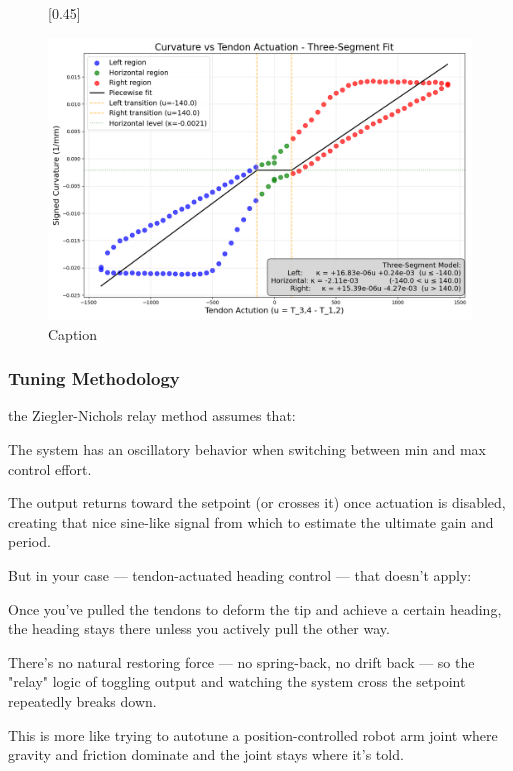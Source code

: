 \begin{figure}[H]
\begin{subcaptionbox}{\label{fig:right}}[0.45\linewidth]
    \end{subcaptionbox}
    \caption{}
    \label{fig:ribbonadaptation}
\end{figure}

\begin{figure} [H]
    \centering
    \includegraphics[width=0.9\linewidth]{images/ribbonadapter/ribbonfit_2025-06-30_15-59-06.png}
    \caption{Caption}
    \label{fig:enter-label}
\end{figure}


\subsubsection{Tuning Methodology}
the Ziegler-Nichols relay method assumes that:

The system has an oscillatory behavior when switching between min and max control effort.

The output returns toward the setpoint (or crosses it) once actuation is disabled, creating that nice sine-like signal from which to estimate the ultimate gain and period.

But in your case — tendon-actuated heading control — that doesn’t apply:

Once you've pulled the tendons to deform the tip and achieve a certain heading, the heading stays there unless you actively pull the other way.

There’s no natural restoring force — no spring-back, no drift back — so the "relay" logic of toggling output and watching the system cross the setpoint repeatedly breaks down.

This is more like trying to autotune a position-controlled robot arm joint where gravity and friction dominate and the joint stays where it's told.

